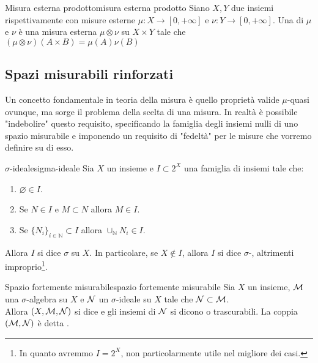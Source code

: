 \documentclass{article}
\renewcommand\N{\mc{N}}
\newcommand\Nat{\mathbb{N}}
\begin{document}
\begin{definition}{Misura esterna prodotto}{misura esterna prodotto}
    Siano $X,Y$ due insiemi rispettivamente con misure esterne $\mu : X \to [0,+\infty]$ e $\nu: Y \to [0,+\infty]$. Una  di $\mu$ e $\nu$ è una misura esterna $\mu \otimes \nu$ su $X\times Y$ tale che $(\mu \otimes \nu)(A \times B) = \mu(A)\nu(B) $
\end{definition}

\pagebreak
\subsection{Spazi misurabili rinforzati}

Un concetto fondamentale in teoria della misura è quello proprietà valide $\mu$-quasi ovunque, ma sorge il problema della scelta di una misura. In realtà è possibile "indebolire" questo requisito, specificando la famiglia degli insiemi nulli di uno spazio misurabile e imponendo un requisito di "fedeltà" per le misure che vorremo definire su di esso.

\begin{definition}{$\sigma$-ideale}{sigma-ideale}
    Sia $X$ un insieme e $I \subset 2^X$ una famiglia di insiemi tale che:\begin{enumerate}
        \item $\varnothing \in I$.
        \item Se $N \in I$ e $M\subset N$ allora $M \in I$.
        \item Se $\{N_i\}_{i \in \Nat}\subset I$ allora $\cup_\Nat N_i \in I$.
    \end{enumerate}
    Allora $I$ si dice $\sigma$ su $X$. In particolare, se $X \notin I$, allora $I$ si dice $\sigma$-, altrimenti improprio\footnote{In quanto avremmo $I=2^X$, non particolarmente utile nel migliore dei casi.}.
\end{definition}

\begin{definition}{Spazio fortemente misurabile}{spazio fortemente misurabile}
    Sia $X$ un insieme, $\mathcal{M}$ una $\sigma$-algebra su $X$ e $\N$ un $\sigma$-ideale su $X$ tale che $\N\subset \M$.\\
    Allora $(X,\M,\N)$ si dice  e gli insiemi di $\N$ si dicono  o trascurabili. La coppia $(\M,\N)$ è detta .
\end{definition}
\end{document}
